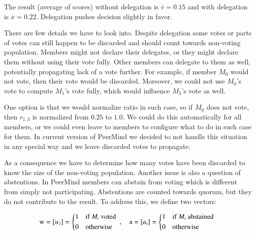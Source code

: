 \documentclass{sigchi}
\begin{document}
The result (average of scores) without delegation is $\overline{v} = 0.15$ and
with delegation is $\overline{x} = 0.22$.
Delegation pushes decision slightly in favor.

There are few details we have to look into.
Despite delegation some votes or parts of votes can still happen to be discarded and should count
towards non-voting population.
Members might not declare their delegates, or they might declare them without using their vote fully.
Other members can delegate to them as well, potentially propagating lack of a vote further.
For example, if member $M_0$ would not vote, then their vote would be discarded.
Moreover, we could not use $M_0$'s vote to compute $M_1$'s vote fully, which would influence $M_3$'s vote as well.

One option is that we would normalize ratio in such case, so if $M_0$ does not vote, then $r_{1,3}$ is normalized
from $0.25$ to $1.0$.
We could do this automatically for all members, or we could even leave to members to configure
what to do in such case for them.
In current version of PeerMind we decided to not handle this situation in any special way and we leave
discarded votes to propagate.


As a consequence we have to determine how many votes have been discarded to know the size of the non-voting
population.
Another issue is also a question of abstentions.
In PeerMind members can abstain from voting which is different from simply not participating.
Abstentions are counted towards quorum, but they do not contribute to the result.
To address this, we define two vectors:

\begin{displaymath}
\mathrm{w} = \left[w_{i}\right] = \begin{dcases*}
 1 & if $M_i$ voted \\
 0 & otherwise \\
\end{dcases*},\quad \mathrm{a} = \left[a_{i}\right] = \begin{dcases*}
 1 & if $M_i$ abstained \\
 0 & otherwise \\
\end{dcases*}
\end{displaymath}
\end{document}
